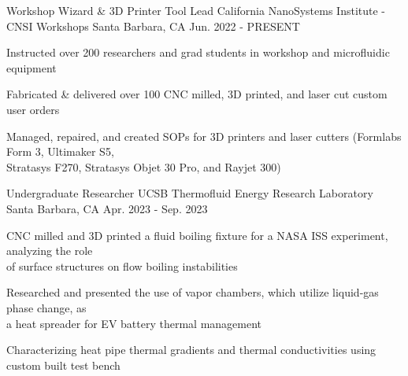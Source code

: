 \begin{cventries}
\cventry
{Workshop Wizard \& 3D Printer Tool Lead} %
{California NanoSystems Institute - CNSI Workshops} %
{Santa Barbara, CA} %
{Jun. 2022 - PRESENT} %
{ %
\begin{cvitems}
\item {Instructed over 200 researchers and grad students in workshop and microfluidic equipment}
\item {Fabricated \& delivered over 100 CNC milled, 3D printed, and laser cut custom user orders}
\item {Managed, repaired, and created SOPs for 3D printers and laser cutters  (Formlabs Form 3,  Ultimaker S5, \\ Stratasys F270, Stratasys Objet 30 Pro, and Rayjet 300)}
\end{cvitems}
}



\cventry
{Undergraduate Researcher} %
{UCSB Thermofluid Energy Research Laboratory} %
{Santa Barbara, CA} %
{Apr. 2023 - Sep. 2023} %
{ %
\begin{cvitems}   
\item {CNC milled and 3D printed a fluid boiling fixture for a NASA ISS experiment, analyzing the role \\ of surface structures on flow boiling instabilities}
\item {Researched and presented the use of vapor chambers, which utilize liquid-gas phase change, as \\ a heat spreader for EV battery thermal management}
\item {Characterizing heat pipe thermal gradients and thermal conductivities using custom built test bench}
\end{cvitems}
}








\end{cventries}

